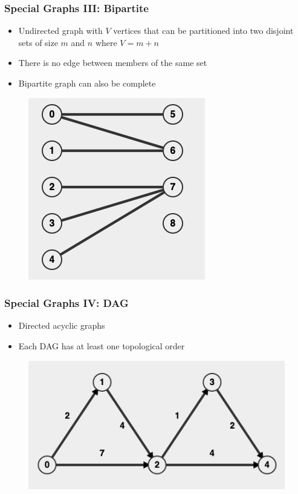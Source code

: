 \documentclass{beamer}
\begin{document}
\begin{frame}
\frametitle{Special Graphs III: Bipartite}
	\begin{itemize}
	    \item Undirected graph with $V$ vertices that can be partitioned into two disjoint sets of size $m$ and $n$ where $V = m + n$
	    \item There is no edge between members of the same set
	    \item Bipartite graph can also be complete
	\end{itemize}
	\begin{figure}
	    \centering
	    \includegraphics[scale=0.35]{imgs/2.4/graph/bipartite.png}
	\end{figure}
\end{frame}

\begin{frame}
\frametitle{Special Graphs IV: DAG}
	\begin{itemize}
	    \item Directed acyclic graphs
	    \item Each DAG has at least one topological order
	\end{itemize}
	\begin{figure}
	    \centering
	    \includegraphics[scale=0.35]{imgs/2.4/graph/dag.png}
	\end{figure}
\end{frame}
\end{document}

